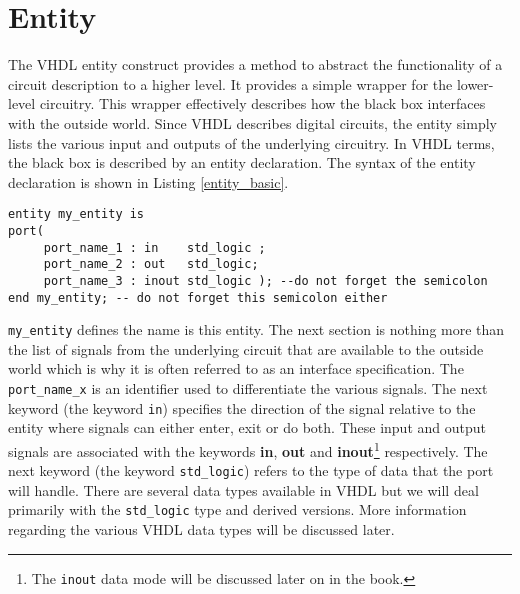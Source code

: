 \section{Entity}
The VHDL entity construct provides a method to abstract the functionality of a circuit description to a higher level. It provides a simple wrapper for the lower-level circuitry. This wrapper effectively describes how the black box interfaces with the outside world. Since VHDL describes digital circuits, the entity simply lists the various input and outputs of the underlying circuitry. In VHDL terms, the black box is described by an entity declaration. The syntax of the entity declaration is shown in Listing \ref{entity_basic}.
\begin{lstlisting}[label=entity_basic, caption=The entity declaration., mathescape=true]
entity my_entity is
port(
     port_name_1 : in    std_logic ;
     port_name_2 : out   std_logic;
     port_name_3 : inout std_logic ); --do not forget the semicolon
end my_entity; -- do not forget this semicolon either
\end{lstlisting}
\texttt{my\_entity} defines the name is this entity. The next section is nothing more than the list of signals from the underlying circuit that are available to the outside world which is why it is often referred to as an interface specification. The \texttt{port\_name\_x} is an identifier used to differentiate the various signals. The next keyword (the keyword \texttt{in}) specifies the direction of the signal relative to the entity where signals can either enter, exit or do both. These input and output signals are associated with the keywords \textbf{in}, \textbf{out} and \textbf{inout}\footnote{The \texttt{inout} data mode will be discussed later on in the book.} respectively. The next keyword (the keyword \texttt{std\_logic}) refers to the type of data that the port will handle. There are several data types available in VHDL but we will deal primarily with the \texttt{std\_logic} type and derived versions. More information regarding the various VHDL data types will be discussed later.

